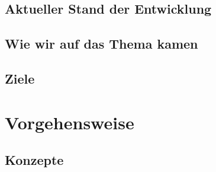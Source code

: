 \documentclass[11pt]{article}
\begin{document}
\subsection{Aktueller Stand der Entwicklung}
\noindent
\StandEntwicklung
\subsection{Wie wir auf das Thema kamen}
\noindent
\Thema
\subsection{Ziele}
\noindent
\Ziele

\newpage
\section{Vorgehensweise}
\subsection{Konzepte}
\noindent
\Vorgehensweise
\end{document}
